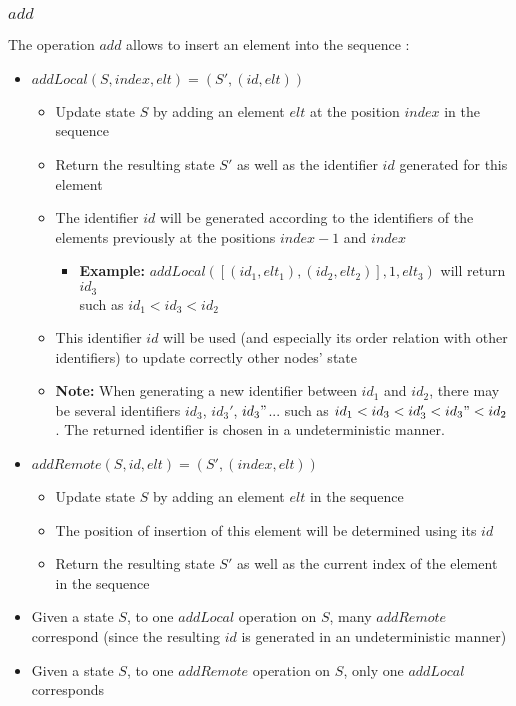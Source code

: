 \documentclass[a4paper]{article}
\begin{document}
\subsubsection{$add$}

The operation $add$ allows to insert an element into the sequence :
\begin{itemize}
  \item $addLocal(S, index, elt) = (S', (id, elt))$
  \begin{itemize}
    \item Update state $S$ by adding an element $elt$ at the position $index$ in the sequence
    \item Return the resulting state $S'$ as well as the identifier $id$ generated for this element
    \item The identifier $id$ will be generated according to the identifiers of the elements previously at the positions $index-1$ and $index$
    \begin{itemize}
      \item \textbf{Example: } $addLocal([(id_1, elt_1), (id_2, elt_2)], 1, elt_3)$ will return $id_3$\\ such as $id_1 < id_3 < id_2$
    \end{itemize}
    \item This identifier $id$ will be used (and especially its order relation with other identifiers) to update correctly other nodes' state
    \item \textbf{Note: } When generating a new identifier between $id_1$ and $id_2$,
      there may be several identifiers $id_3$, $id_3'$, $id_3"$... such as
      $id_1 < id_3 < id_3' < id_3" < id_2$. The returned identifier is chosen in a undeterministic manner.
  \end{itemize}
  \item $addRemote(S, id, elt) = (S', (index, elt))$
  \begin{itemize}
    \item Update state $S$ by adding an element $elt$ in the sequence
    \item The position of insertion of this element will be determined using its $id$
    \item Return the resulting state $S'$ as well as the current index of the element in the sequence
  \end{itemize}
  \item Given a state $S$, to one $addLocal$ operation on $S$, many $addRemote$ correspond
    (since the resulting $id$ is generated in an undeterministic manner)
  \item Given a state $S$, to one $addRemote$ operation on $S$, only one $addLocal$ corresponds
\end{itemize}
\end{document}
